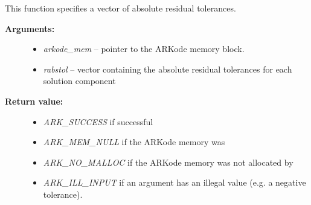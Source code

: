 \documentclass[letterpaper,10pt,english]{sphinxmanual}
\begin{document}
\begin{fulllineitems}
\label{c_interface/User_callable:ARKodeResVtolerance}
This function specifies a vector of absolute residual tolerances.
\begin{description}
\item[{\textbf{Arguments:}}] \leavevmode\begin{itemize}
\item {} 
\emph{arkode\_mem} -- pointer to the ARKode memory block.

\item {} 
\emph{rabstol} -- vector containing the absolute residual
tolerances for each solution component

\end{itemize}

\item[{\textbf{Return value:}}] \leavevmode\begin{itemize}
\item {} 
\emph{ARK\_SUCCESS} if successful

\item {} 
\emph{ARK\_MEM\_NULL}  if the ARKode memory was 

\item {} 
\emph{ARK\_NO\_MALLOC}  if the ARKode memory was not allocated by {\hyperref[c_interface/User_callable:ARKodeInit]{}}

\item {} 
\emph{ARK\_ILL\_INPUT} if an argument has an illegal value (e.g. a negative tolerance).

\end{itemize}

\end{description}

\end{fulllineitems}

\end{document}
